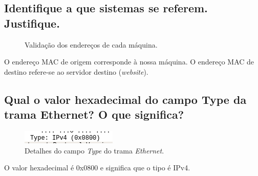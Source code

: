 \documentclass[a4paper]{article}
\begin{document}
 \subsection{Identifique	a	que	sistemas	se	referem. Justifique.}
\begin{figure}[H]%
    \centering
    \qquad
    \caption{Validação dos endereços de cada máquina.}%
    \label{fig:example}%
\end{figure}
 
 O endereço MAC de origem corresponde à nossa máquina. 
 O endereço MAC de destino refere-se ao servidor destino (\textit{website}).
 
 \subsection{Qual o	valor hexadecimal do campo Type da trama Ethernet? O que significa?}
 \begin{figure}[H]
\centering
\includegraphics[scale=0.60]{pics/p3.png}
\caption{Detalhes do campo \textit{Type} do trama \textit{Ethernet}.}
\end{figure}
 O valor hexadecimal é  0x0800 e significa que o tipo é IPv4.
 
\end{document}
